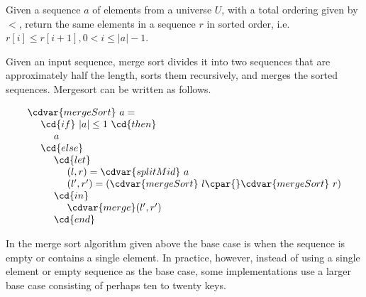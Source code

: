 \begin{cluster}
\label{grp:def:problem::comparison-sorting}

\begin{definition}
\label{def:problem::comparison-sorting}
  Given a sequence $a$ of elements from a universe $U$, with a total
  ordering given by $<$, return the same elements in a sequence $r$
  in sorted order, i.e. $r[i] \leq r[i+1], 0 < i \leq |a|-1$.

\end{definition}
\end{cluster}

\begin{cluster}
\label{grp:alg:design::dc::mergesort}

\begin{algorithm}
\label{alg:design::dc::mergesort}

Given an input sequence, merge sort divides it into two sequences that
are approximately half the length, sorts them recursively, and merges
the sorted sequences.
Mergesort can be written as follows.

\[
\begin{array}{l}
\cdvar{mergeSort}~a =
\\ 
~~~~\cd{if}~|a| \leq 1~\cd{then}
\\ 
~~~~~~~~a
\\
~~~~\cd{else}
\\ 
~~~~~~~~\cd{let}
\\
~~~~~~~~~~~~(l,r) = \cdvar{splitMid}~a
\\ 
~~~~~~~~~~~~(l',r') = (\cdvar{mergeSort}~l \cpar{} \cdvar{mergeSort}~r)
\\
~~~~~~~~\cd{in}
\\ 
~~~~~~~~~~~~\cdvar{merge} (l',r')
\\
~~~~~~~~\cd{end}
\end{array} 
\]

\end{algorithm}
\end{cluster}

\begin{cluster}
\label{grp:nt:design::dc::merge}

\begin{note}
\label{nt:design::dc::merge}
In the merge sort algorithm given above the base case is when the
sequence is empty or contains a single element.  In practice, however,
instead of using a single element or empty sequence as the base case,
some implementations use a larger base case consisting of perhaps ten
to twenty keys.

\end{note}
\end{cluster}

